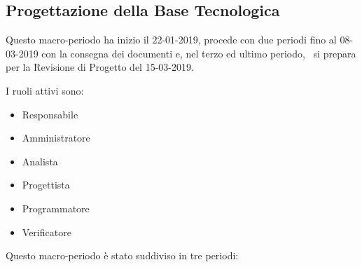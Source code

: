 		\newpage
		
        \subsection{Progettazione della Base Tecnologica}
		Questo macro-periodo ha inizio il 22-01-2019, procede con due periodi fino al 08-03-2019 con la consegna
		dei documenti e, nel terzo ed ultimo periodo, \gruppo\ si prepara per la Revisione di Progetto del 15-03-2019.
        
        I ruoli attivi sono: 
        \begin{itemize}
            \item Responsabile
            \item Amministratore
            \item Analista
            \item Progettista
            \item Programmatore
            \item Verificatore
        \end{itemize}
        Questo macro-periodo è stato suddiviso in tre periodi:
